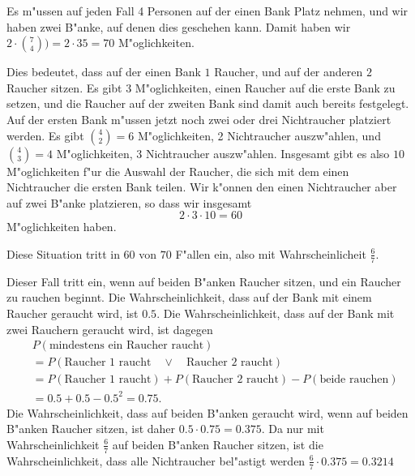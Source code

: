 \begin{loesung}
\begin{teilaufgaben}
\item
Es m"ussen auf jeden Fall 4 Personen auf der einen Bank Platz nehmen,
und wir haben zwei B"anke, auf denen dies geschehen kann. 
Damit haben wir $2\cdot\binom{7}{4})=2\cdot 35=70$ M"oglichkeiten.
\item
Dies bedeutet, dass auf der einen Bank $1$ Raucher, und auf der anderen
$2$ Raucher sitzen.
Es gibt $3$ M"oglichkeiten, einen Raucher auf die erste Bank zu setzen,
und die Raucher auf der zweiten Bank sind damit auch bereits festgelegt.
Auf der ersten Bank m"ussen jetzt noch zwei oder drei Nichtraucher platziert
werden.
Es gibt $\binom{4}{2}=6$ M"oglichkeiten, 2 Nichtraucher auszw"ahlen, und
$\binom{4}{3}=4$ M"oglichkeiten, 3 Nichtraucher auszw"ahlen.
Insgesamt gibt es also $10$ M"oglichkeiten f"ur die Auswahl der Raucher,
die sich mit dem einen Nichtraucher die ersten Bank teilen.
Wir k"onnen den einen Nichtraucher aber auf zwei B"anke platzieren, so dass
wir insgesamt
\[
2\cdot 3\cdot 10 = 60
\]
M"oglichkeiten haben.
\item
Diese Situation tritt in $60$ von $70$ F"allen ein, also mit
Wahrscheinlicheit $\frac{6}{7}$.
\item
Dieser Fall tritt ein, wenn auf beiden B"anken Raucher sitzen,
und ein Raucher zu rauchen beginnt.
Die Wahrscheinlichkeit, dass auf der Bank mit einem Raucher geraucht
wird, ist $0.5$.
Die Wahrscheinlichkeit, dass auf der Bank mit zwei Rauchern geraucht
wird, ist dagegen
\begin{align*}
&
P(\text{mindestens ein Raucher raucht})
\\
&=
P(\text{Raucher 1 raucht}\quad\vee\quad\text{Raucher 2 raucht})
\\
&=
P(\text{Raucher 1 raucht})
+
P(\text{Raucher 2 raucht})
-
P(\text{beide rauchen})
\\
&=
0.5+0.5-0.5^2 = 0.75.
\end{align*}
Die Wahrscheinlichkeit, dass auf beiden B"anken geraucht wird, wenn auf
beiden B"anken Raucher sitzen, ist daher $0.5\cdot 0.75 = 0.375$.
Da nur mit Wahrscheinlichkeit $\frac{6}{7}$ auf beiden B"anken
Raucher sitzen, ist die Wahrscheinlichkeit, dass alle Nichtraucher
bel"astigt werden $\frac{6}{7}\cdot 0.375=0.3214$
\end{teilaufgaben}
\end{loesung}

\begin{bewertung}
\end{bewertung}


